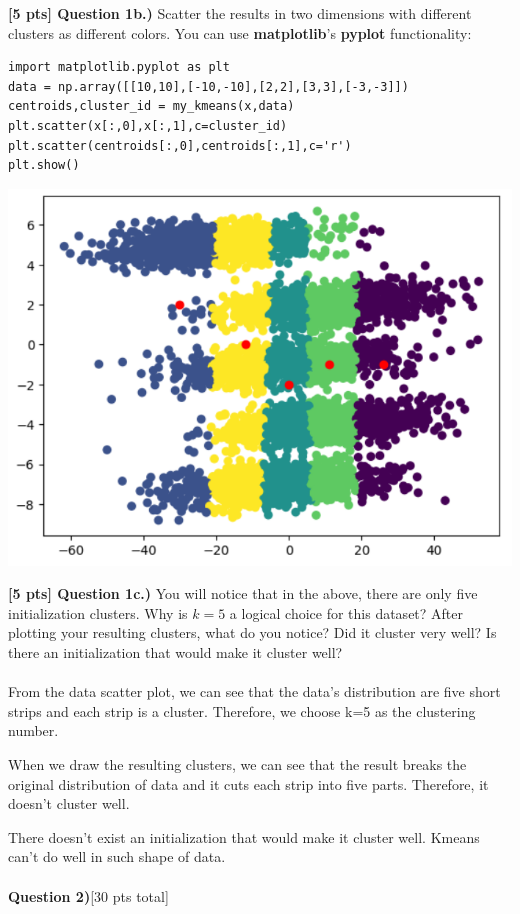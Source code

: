 \documentclass[paper=a4, fontsize=11pt]{scrartcl} %
\begin{document}
\textbf{[5 pts] Question 1b.)} Scatter the results in two dimensions with different clusters as different colors. You can use \textbf{matplotlib}'s \textbf{pyplot} functionality:

\begin{verbatim}
import matplotlib.pyplot as plt
data = np.array([[10,10],[-10,-10],[2,2],[3,3],[-3,-3]])
centroids,cluster_id = my_kmeans(x,data)
plt.scatter(x[:,0],x[:,1],c=cluster_id)
plt.scatter(centroids[:,0],centroids[:,1],c='r')
plt.show()
\end{verbatim}

\includegraphics{include/k-means_cluster.png}

\textbf{[5 pts] Question 1c.)} You will notice that in the above, there are only five initialization clusters. Why is $k=5$ a logical choice for this dataset? After plotting your resulting clusters, what do you notice? Did it cluster very well? Is there an initialization that would make it cluster well?\\
\\
From the data scatter plot, we can see that the data's distribution are five short strips and each strip is a cluster. Therefore, we choose k=5 as the clustering number. 


When we draw the resulting clusters, we can see that the result breaks the original distribution of data and it cuts each strip into five parts. Therefore, it doesn't cluster well.


There doesn't exist an initialization that would make it cluster well. Kmeans can't do well in such shape of data. \\
\\
{\Large \textbf{Question 2)}[30 pts total]} \\
\end{document}
